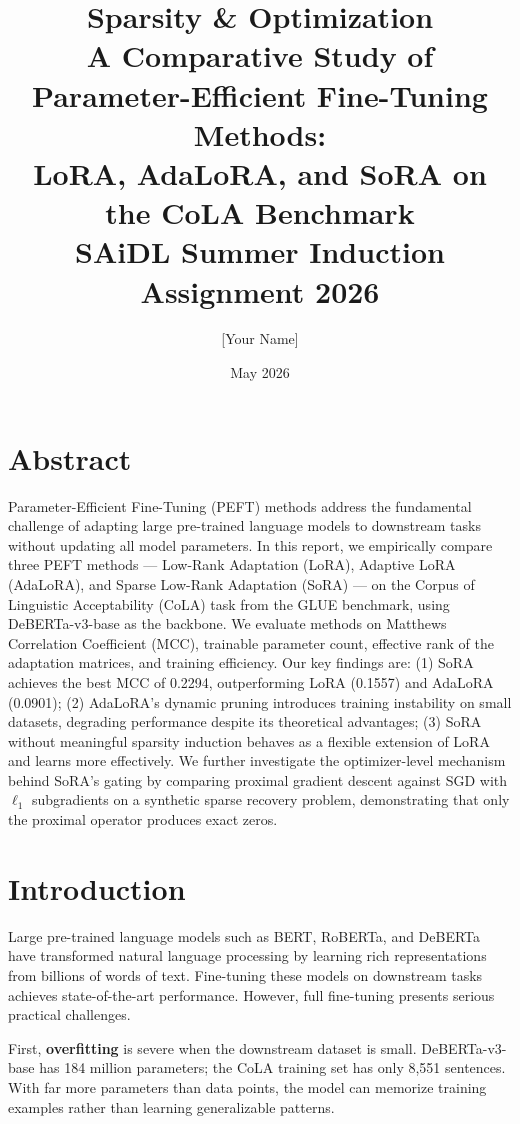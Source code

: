 \documentclass[12pt,a4paper]{article}
\title{
    \textbf{Sparsity \& Optimization}\\[0.5em]
    \large A Comparative Study of Parameter-Efficient Fine-Tuning Methods:\\
    LoRA, AdaLoRA, and SoRA on the CoLA Benchmark\\[1em]
    \normalsize SAiDL Summer Induction Assignment 2026
}
\author{[Your Name]}
\date{May 2026}
\theoremstyle{definition}
\begin{document}
\maketitle
\tableofcontents
\newpage

\section{Abstract}

Parameter-Efficient Fine-Tuning (PEFT) methods address the fundamental challenge of adapting large pre-trained language models to downstream tasks without updating all model parameters. In this report, we empirically compare three PEFT methods — Low-Rank Adaptation (LoRA), Adaptive LoRA (AdaLoRA), and Sparse Low-Rank Adaptation (SoRA) — on the Corpus of Linguistic Acceptability (CoLA) task from the GLUE benchmark, using DeBERTa-v3-base as the backbone. We evaluate methods on Matthews Correlation Coefficient (MCC), trainable parameter count, effective rank of the adaptation matrices, and training efficiency. Our key findings are: (1) SoRA achieves the best MCC of 0.2294, outperforming LoRA (0.1557) and AdaLoRA (0.0901); (2) AdaLoRA's dynamic pruning introduces training instability on small datasets, degrading performance despite its theoretical advantages; (3) SoRA without meaningful sparsity induction behaves as a flexible extension of LoRA and learns more effectively. We further investigate the optimizer-level mechanism behind SoRA's gating by comparing proximal gradient descent against SGD with $\ell_1$ subgradients on a synthetic sparse recovery problem, demonstrating that only the proximal operator produces exact zeros.

\section{Introduction}

Large pre-trained language models such as BERT, RoBERTa, and DeBERTa have transformed natural language processing by learning rich representations from billions of words of text. Fine-tuning these models on downstream tasks achieves state-of-the-art performance. However, full fine-tuning presents serious practical challenges.

First, \textbf{overfitting} is severe when the downstream dataset is small. DeBERTa-v3-base has 184 million parameters; the CoLA training set has only 8,551 sentences. With far more parameters than data points, the model can memorize training examples rather than learning generalizable patterns.
\end{document}
